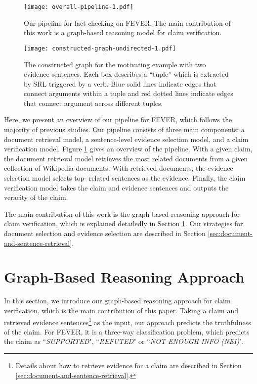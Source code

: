 \documentclass[11pt,a4paper]{article}
\begin{document}
\begin{figure}[h]
	\texttt{[image: overall-pipeline-1.pdf]}
	\caption{Our pipeline for fact checking on FEVER. The main contribution of this work is a graph-based reasoning model for claim verification. }
	\label{fig:overall-pipeline}
\end{figure}
\begin{figure*}[t]
	\centering
	\texttt{[image: constructed-graph-undirected-1.pdf]}
	\caption{The constructed graph for the motivating example with two evidence sentences. Each box describes a ``tuple'' which is extracted by SRL triggered by a verb. Blue solid lines indicate edges that connect arguments within a tuple and red dotted lines indicate edges that connect argument across different tuples.}
	\label{fig:graph-construction}
\end{figure*} 
Here, we present an overview of our pipeline for FEVER, which follows the majority of previous studies.
Our pipeline consists of three main components: a {document retrieval model}, a {sentence-level evidence selection model}, and a {claim verification model}.  
Figure \ref{fig:overall-pipeline} gives an overview of the pipeline.
With a given claim, the {document retrieval model} retrieves the most related documents from a given collection of Wikipedia documents. 
With retrieved documents, the {evidence selection model} selects top- related sentences as the evidence. 
Finally, the {claim verification model} takes the claim and evidence sentences and outputs the 
veracity of the claim. 


The main contribution of this work is the graph-based reasoning approach for claim verification, which is explained detailedly in Section \ref{section:claim-verification}.
Our strategies for document selection and evidence selection are described in Section \ref{sec:document-and-sentence-retrieval}.



\section{Graph-Based Reasoning Approach}
\label{section:claim-verification}
In this section, we introduce our graph-based reasoning approach for claim verification, which is the main contribution of this paper. 
Taking a claim and retrieved evidence sentences\footnote{Details about how to retrieve evidence for a claim are described in Section \ref{sec:document-and-sentence-retrieval}.} as the input, our approach predicts the truthfulness of the claim. For FEVER, it is a three-way classification problem, which predicts the claim as ``\textsl{SUPPORTED}", ``\textsl{REFUTED}" or ``\textsl{NOT ENOUGH INFO (NEI)}".
\end{document}
